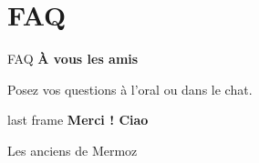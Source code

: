 \documentclass[11pt,aspectratio=169]{beamer}
\begin{document}
\section{FAQ}
\begin{frame}{FAQ}
  {\Large\color{DauphineBleu}\bfseries À vous les amis}\par
  \medskip
  Posez vos questions à l'oral ou dans le chat.
\end{frame}

\begin{frame}{last frame}
  \centering
  {\LARGE\color{DauphineBleu}\bfseries Merci ! Ciao}\par
  \vspace{8mm}
  {\large }\par
  \medskip
  {\large }\par
  \vspace{10mm}
  Les anciens de Mermoz
\end{frame}
\end{document}
